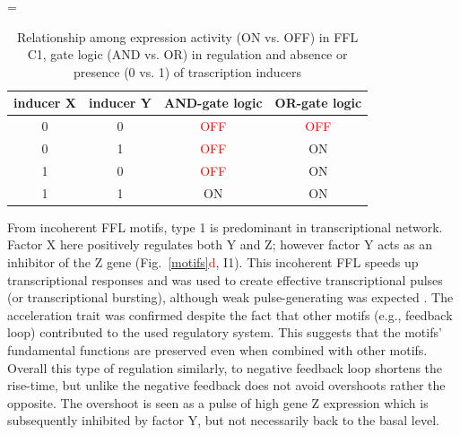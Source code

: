 
\begin{center}
\LTcapwidth=\textwidth
    \begin{longtable}[c]{|c|c|c|c|}
\caption{Relationship among expression activity (ON vs. OFF) in FFL C1, gate logic (AND vs. OR) in regulation and absence or presence (0 vs. 1) of trascription inducers} \label{ANDvsOR} \\

\toprule \multicolumn{1}{|c|}{\textbf{inducer X}} & \multicolumn{1}{c|}{\textbf{inducer Y}}  & \multicolumn{1}{c|}{\textbf{AND-gate logic}} & \multicolumn{1}{c|}{\textbf{OR-gate logic}} \\
\midrule
\endhead

\bottomrule
\endlastfoot

0 & 0 & \textcolor{red}{OFF} & \textcolor{red}{OFF} \\
\hline
0 & 1 & \textcolor{red}{OFF} & \textcolor{mygreen}{ON} \\
\hline
1 & 0 & \textcolor{red}{OFF} & \textcolor{mygreen}{ON} \\
\hline
1 & 1 & \textcolor{mygreen}{ON} & \textcolor{mygreen}{ON} \\
    \end{longtable}
\end{center}


From incoherent FFL motifs, type 1 is predominant in  transcriptional network.
Factor X here positively regulates both Y and Z; however factor Y acts as an inhibitor of the Z gene (Fig.~\ref{motifs}\textcolor{red}{d}, I1).
This incoherent FFL speeds up transcriptional responses and was used to create effective transcriptional pulses (or transcriptional bursting), although weak pulse-generating was expected \cite{mangan2003structure, basu2004spatiotemporal, mangan2006incoherent}.
The acceleration trait was confirmed despite the fact that other motifs (e.g., feedback loop) contributed to the used regulatory system.
This suggests that the motifs' fundamental functions are preserved even when combined with other motifs.
Overall this type of regulation similarly, to negative feedback loop shortens the rise-time, but unlike the negative feedback does not avoid overshoots rather the opposite.
The overshoot is seen as a pulse of high gene Z expression which is subsequently inhibited by factor Y, but not necessarily back to the basal level.

